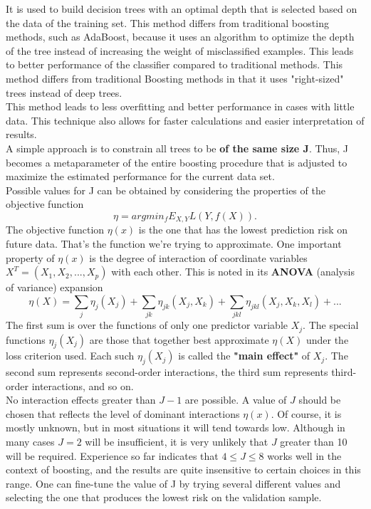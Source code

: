 \documentclass[12pt, letterpaper, twoside]{article}
\begin{document}
\hspace*{4ex}It is used to build decision trees with an optimal depth that is selected based on the data of the training set. This method differs from traditional boosting methods, such as AdaBoost, because it uses an algorithm to optimize the depth of the tree instead of increasing the weight of misclassified examples. This leads to better performance of the classifier compared to traditional methods. This method differs from traditional Boosting methods in that it uses "right-sized" trees instead of deep trees.\\
\hspace*{4ex}This method leads to less overfitting and better performance in cases with little data. This technique also allows for faster calculations and easier interpretation of results.\\
\hspace*{4ex} A simple approach is to constrain all trees to be \textbf{of the same size J}. Thus, J becomes a metaparameter of the entire boosting procedure that is adjusted to maximize the estimated performance for the current data set.\\
Possible values for J can be obtained by considering the properties of the objective function
\begin{equation*}
\eta=argmin_f E_{X,Y} L(Y,f(X)).
\end{equation*}
The objective function $\eta(x)$ is the one that has the lowest prediction risk on future data. That's the function we're trying to approximate. One important property of $\eta(x)$ is the degree of interaction of coordinate variables $X^T=(X_1,X_2,...,X_p)$ with each other. This is noted in its \textbf{ANOVA} (analysis of variance) expansion 
\begin{equation*}
\eta(X)=\sum_j \eta_j(X_j)+\sum_{jk} \eta_{jk}(X_j,X_k)+\sum_{jkl}\eta_{jkl}(X_j,X_k,X_l)+...
\end{equation*}
The first sum is over the functions of only one predictor variable $X_j$. The special functions $\eta_j(X_j)$ are those that together best approximate $\eta(X)$ under the loss criterion used. Each such $\eta_j(X_j)$ is called the \textbf{"main effect"} of $X_j$. The second sum represents second-order interactions, the third sum represents third-order interactions, and so on.\\
\hspace*{4ex} No interaction effects greater than $J-1$
are possible. A value of $J$ should be chosen that reflects the level of dominant interactions $\eta(x)$. Of course, it is mostly unknown, but in most situations it will tend towards low. Although in many cases $J=2$ will be insufficient, it is very unlikely that $J$ greater than 10 will be required. Experience so far indicates that $4 \le J \le 8$ works well in the context of boosting, and the results are quite insensitive to certain choices in this range. One can fine-tune the value of J by trying several different values and selecting the one that produces the lowest risk on the validation sample.
\end{document}
